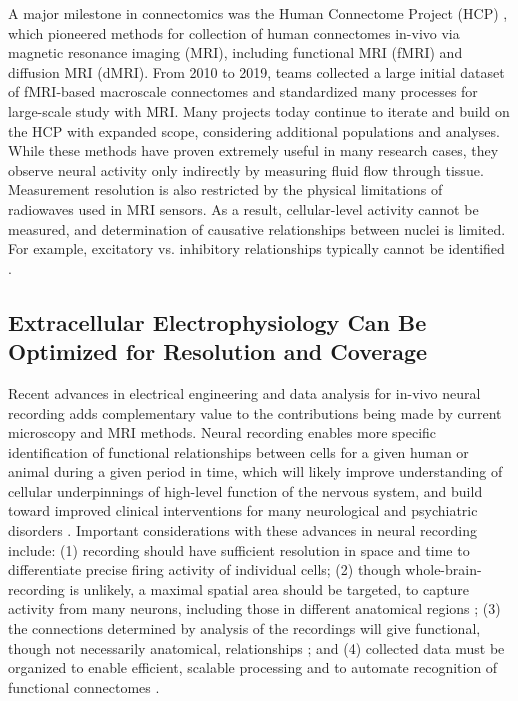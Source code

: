 \documentclass[11pt]{article}
\newcommand{\subsectionwithindent}[1]{
    \subsection*{#1}
    \hspace{\parindent} %
}
\begin{document}
A major milestone in connectomics was the Human Connectome Project (HCP) \cite{elam2021hcp}, which pioneered methods for collection of human connectomes in-vivo via magnetic resonance imaging (MRI), including functional MRI (fMRI) and diffusion MRI (dMRI). From 2010 to 2019, teams collected a large initial dataset of fMRI-based macroscale connectomes and standardized many processes for large-scale study with MRI. Many projects today continue to iterate and build on the HCP with expanded scope, considering additional populations and analyses. While these methods have proven extremely useful in many research cases, they observe neural activity only indirectly by measuring fluid flow through tissue. Measurement resolution is also restricted by the physical limitations of radiowaves used in MRI sensors. As a result, cellular-level activity cannot be measured, and determination of causative relationships between nuclei is limited. For example, excitatory vs. inhibitory relationships typically cannot be identified \cite{hagman2010mriconnectomics}.

\subsectionwithindent{Extracellular Electrophysiology Can Be Optimized for Resolution and Coverage}
Recent advances in electrical engineering and data analysis for in-vivo neural recording adds complementary value to the contributions being made by current microscopy and MRI methods. Neural recording enables more specific identification of functional relationships between cells for a given human or animal during a given period in time, which will likely improve understanding of cellular underpinnings of high-level function of the nervous system, and build toward improved clinical interventions for many neurological and psychiatric disorders \cite{kobayashi2025connections, zhang2025neds,musk2019integrated, card2024neuroprosthesis}. Important considerations with these advances in neural recording include: (1) recording should have sufficient resolution in space and time to differentiate precise firing activity of individual cells; (2) though whole-brain-recording is unlikely, a maximal spatial area should be targeted, to capture activity from many neurons, including those in different anatomical regions \cite{jun2017probes}; (3) the connections determined by analysis of the recordings will give functional, though not necessarily anatomical, relationships \cite{ciarrusta2023connectome}; and (4) collected data must be organized to enable efficient, scalable processing and to automate recognition of functional connectomes \cite{pachitariu2016kilosort, buccino2020spikeinterface}.
\end{document}
